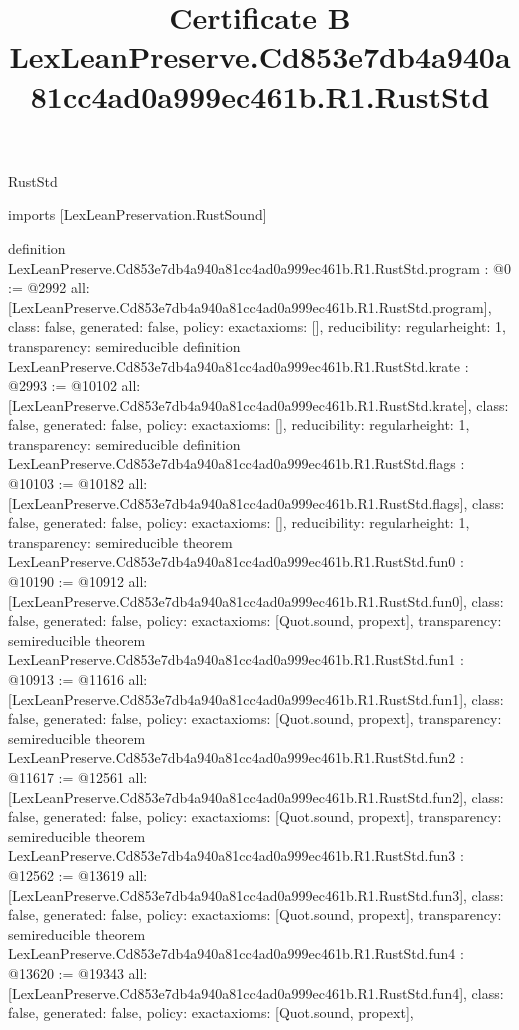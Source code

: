 \begin{lexlean}{RustStd}
\title{Certificate B LexLeanPreserve.Cd853e7db4a940a81cc4ad0a999ec461b.R1.RustStd}
\begin{coremodule}
imports [LexLeanPreservation.RustSound]

definition LexLeanPreserve.Cd853e7db4a940a81cc4ad0a999ec461b.R1.RustStd.program : @0 := @2992 {
  all: [LexLeanPreserve.Cd853e7db4a940a81cc4ad0a999ec461b.R1.RustStd.program],
  class: false,
  generated: false,
  policy: exact{axioms: []},
  reducibility: regular{height: 1},
  transparency: semireducible
}
definition LexLeanPreserve.Cd853e7db4a940a81cc4ad0a999ec461b.R1.RustStd.krate : @2993 := @10102 {
  all: [LexLeanPreserve.Cd853e7db4a940a81cc4ad0a999ec461b.R1.RustStd.krate],
  class: false,
  generated: false,
  policy: exact{axioms: []},
  reducibility: regular{height: 1},
  transparency: semireducible
}
definition LexLeanPreserve.Cd853e7db4a940a81cc4ad0a999ec461b.R1.RustStd.flags : @10103 := @10182 {
  all: [LexLeanPreserve.Cd853e7db4a940a81cc4ad0a999ec461b.R1.RustStd.flags],
  class: false,
  generated: false,
  policy: exact{axioms: []},
  reducibility: regular{height: 1},
  transparency: semireducible
}
theorem LexLeanPreserve.Cd853e7db4a940a81cc4ad0a999ec461b.R1.RustStd.fun0 : @10190 := @10912 {
  all: [LexLeanPreserve.Cd853e7db4a940a81cc4ad0a999ec461b.R1.RustStd.fun0],
  class: false,
  generated: false,
  policy: exact{axioms: [Quot.sound, propext]},
  transparency: semireducible
}
theorem LexLeanPreserve.Cd853e7db4a940a81cc4ad0a999ec461b.R1.RustStd.fun1 : @10913 := @11616 {
  all: [LexLeanPreserve.Cd853e7db4a940a81cc4ad0a999ec461b.R1.RustStd.fun1],
  class: false,
  generated: false,
  policy: exact{axioms: [Quot.sound, propext]},
  transparency: semireducible
}
theorem LexLeanPreserve.Cd853e7db4a940a81cc4ad0a999ec461b.R1.RustStd.fun2 : @11617 := @12561 {
  all: [LexLeanPreserve.Cd853e7db4a940a81cc4ad0a999ec461b.R1.RustStd.fun2],
  class: false,
  generated: false,
  policy: exact{axioms: [Quot.sound, propext]},
  transparency: semireducible
}
theorem LexLeanPreserve.Cd853e7db4a940a81cc4ad0a999ec461b.R1.RustStd.fun3 : @12562 := @13619 {
  all: [LexLeanPreserve.Cd853e7db4a940a81cc4ad0a999ec461b.R1.RustStd.fun3],
  class: false,
  generated: false,
  policy: exact{axioms: [Quot.sound, propext]},
  transparency: semireducible
}
theorem LexLeanPreserve.Cd853e7db4a940a81cc4ad0a999ec461b.R1.RustStd.fun4 : @13620 := @19343 {
  all: [LexLeanPreserve.Cd853e7db4a940a81cc4ad0a999ec461b.R1.RustStd.fun4],
  class: false,
  generated: false,
  policy: exact{axioms: [Quot.sound, propext]},
}
\end{coremodule}
\end{lexlean}
